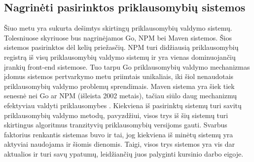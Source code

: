 \subsection{Nagrinėti pasirinktos priklausomybių sistemos}

Šiuo metu yra sukurta dešimtys skirtingų priklausomybių valdymo sistemų. Tolesniuose skyriuose bus nagrinėjamos
Go, NPM bei Maven sistemos. Šios sistemos pasirinktos dėl kelių priežasčių. NPM turi didžiausią priklausomybių
registrą iš visų priklausomybių valdymo sistemų ir yra vienas dominuojančių įrankių front-end sistemose. Tuo tarpu
Go priklausomybių valdymo mechanizmas įdomus sistemos pertvarkymo metu priimtais unikaliais, iki šiol nenaudotais
priklausomybių valdymo problemų sprendimais. Maven sistema yra šiek tiek senesnė nei Go ar NPM (išleista 2002 metais),
tačiau siūlo daug mechanizmų efektyviau valdyti priklausomybes \cite{PAD17}. Kiekviena iš pasirinktų sistemų turi savitų priklausomybių
valdymo metodų, pavyzdžiui, visos trys iš šių sistemų turi skirtingus algoritmus tranzityvių priklausomybių versijoms gauti.
Svarbus faktorius renkantis sistemas buvo ir tai, jog kiekviena iš minėtų sistemų yra aktyviai naudojama ir šiomis dienomis.
Taigi, visos trys sistemos yra vis dar aktualios ir turi savų ypatumų, leidžiančių juos palyginti kursinio darbo eigoje.